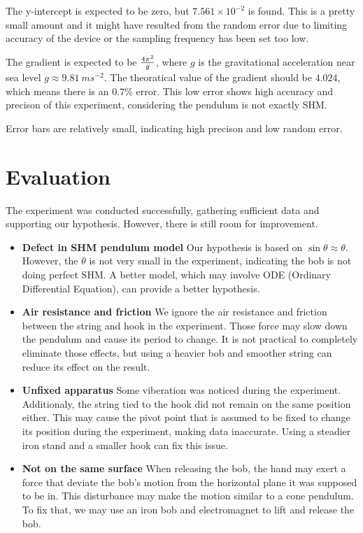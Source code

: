 \documentclass[a4paper]{article}
\begin{document}
The y-intercept is expected to be zero, but $7.561\times 10^{-2}$ is found. This is a pretty small amount and it might have resulted from the random error due to limiting accuracy of the device or the sampling frequency has been set too low.

The gradient is expected to be $4\pi^2 \over g$, where $g$ is the gravitational acceleration near sea level $g\approx \SI{9.81}{ms^{-2}}$. The theoratical value of the gradient should be $4.024$, which means there is an $0.7\%$ error. This low error shows high accuracy and precison of this experiment, considering the pendulum is not exactly SHM.

Error bars are relatively small, indicating high precison and low random error. 


\section{Evaluation}

The experiment was conducted successfully, gathering sufficient data and supporting our hypothesis. However, there is still room for improvement. 

\begin{itemize}
    \item \textbf{Defect in SHM pendulum model} Our hypothesis is based on $\sin\theta\approx\theta$. However, the $\theta$ is not very small in the experiment, indicating the bob is not doing perfect SHM. A better model, which may involve ODE (Ordinary Differential Equation), can provide a better hypothesis.
    \item \textbf{Air resistance and friction} We ignore the air resistance and friction between the string and hook in the experiment. Those force may slow down the pendulum and cause its period to change. It is not practical to completely eliminate those effects, but using a heavier bob and smoother string can reduce its effect on the result. 
    \item \textbf{Unfixed apparatus} Some viberation was noticed during the experiment. Additionaly, the string tied to the hook did not remain on the same position either. This may cause the pivot point that is assumed to be fixed to change its position during the experiment, making data inaccurate. Using a steadier iron stand and a smaller hook can fix this issue. 
    \item \textbf{Not on the same surface} When releasing the bob, the hand may exert a force that deviate the bob's motion from the horizontal plane it was supposed to be in. This disturbance may make the motion similar to a cone pendulum. To fix that, we may use an iron bob and electromagnet to lift and release the bob.
\end{itemize}
\end{document}
